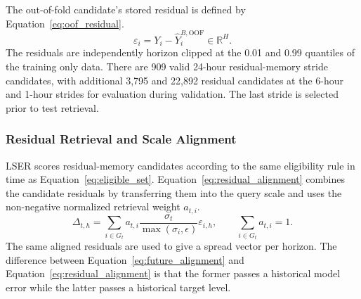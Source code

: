 \documentclass{ieeeaccess}
\begin{document}
The out-of-fold candidate's stored residual is defined by Equation~\eqref{eq:oof_residual}.
\begin{equation}
\varepsilon_i=Y_i-\hat{Y}^{B,\mathrm{OOF}}_i\in\mathbb{R}^{H}.
\label{eq:oof_residual}
\end{equation}
The residuals are independently horizon clipped at the 0.01 and 0.99 quantiles of the training only data. There are 909 valid 24-hour residual-memory stride candidates, with additional 3,795 and 22,892 residual candidates at the 6-hour and 1-hour strides for evaluation during validation. The last stride is selected prior to test retrieval.

\subsubsection{Residual Retrieval and Scale Alignment}
LSER scores residual-memory candidates according to the same eligibility rule in time as Equation~\eqref{eq:eligible_set}. Equation~\eqref{eq:residual_alignment} combines the candidate residuals by transferring them into the query scale and uses the non-negative normalized retrieval weight $a_{t, i}$.
\begin{equation}
\Delta_{t,h}=\sum_{i\in G_t}a_{t,i}
\frac{\sigma_t}{\max(\sigma_i,\epsilon)}\varepsilon_{i,h},
\qquad \sum_{i\in G_t}a_{t,i}=1.
\label{eq:residual_alignment}
\end{equation}
The same aligned residuals are used to give a spread vector per horizon. The difference between Equation~\eqref{eq:future_alignment} and Equation~\eqref{eq:residual_alignment} is that the former passes a historical model error while the latter passes a historical target level.
\end{document}

